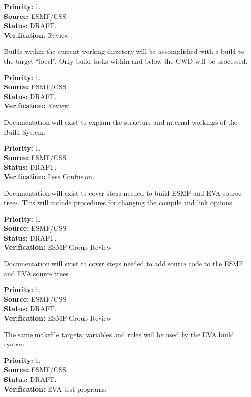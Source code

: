 \begin{reqlist}
{\bf Priority:} 1. \\
{\bf Source:} ESMF/CSS. \\
{\bf Status:} DRAFT. \\
{\bf Verification:} Review
\end{reqlist}

Builds within the current working directory will be
accomplished with a build to the target ``local''.
Only build tasks within and below the CWD will be
processed.  
\begin{reqlist}
{\bf Priority:} 1. \\
{\bf Source:} ESMF/CSS. \\
{\bf Status:} DRAFT. \\
{\bf Verification:} Review
\end{reqlist}


Documentation will exist to explain the structure and 
internal workings of the Build System.
\begin{reqlist}
{\bf Priority:} 1. \\
{\bf Source:} ESMF/CSS. \\
{\bf Status:} DRAFT. \\
{\bf Verification:} Less Confusion.
\end{reqlist}

Documentation will exist to cover steps needed to build ESMF
and EVA source trees.  This will include procedures for 
changing the compile and link options.
\begin{reqlist}
{\bf Priority:} 1. \\
{\bf Source:} ESMF/CSS. \\
{\bf Status:} DRAFT. \\
{\bf Verification:} ESMF Group Review
\end{reqlist}

Documentation will exist to cover steps needed to add source
code to the ESMF and EVA source trees.
\begin{reqlist}
{\bf Priority:} 1. \\
{\bf Source:} ESMF/CSS. \\
{\bf Status:} DRAFT. \\
{\bf Verification:} ESMF Group Review
\end{reqlist}

The same makefile targets, variables and rules
will be used by the EVA build system.
\begin{reqlist}
{\bf Priority:} 1. \\
{\bf Source:} ESMF/CSS. \\
{\bf Status:} DRAFT. \\
{\bf Verification:} EVA test programs.
\end{reqlist}


